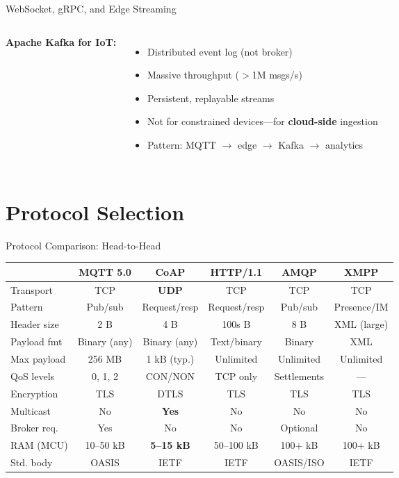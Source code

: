 \documentclass[aspectratio=169,11pt]{beamer}
\begin{document}
\begin{frame}{WebSocket, gRPC, and Edge Streaming}
\begin{columns}
        \vspace{0.2cm}
        \textbf{Apache Kafka for IoT:}
        \begin{itemize}
            \item Distributed event log (not broker)
            \item Massive throughput ($>$1M msgs/s)
            \item Persistent, replayable streams
            \item Not for constrained devices---for \textbf{cloud-side} ingestion
            \item Pattern: MQTT $\rightarrow$ edge $\rightarrow$ Kafka $\rightarrow$ analytics
        \end{itemize}
    \end{columns}
\end{frame}

\section{Protocol Selection}

\begin{frame}{Protocol Comparison: Head-to-Head}
    \footnotesize
    \begin{center}
    \begin{tabular}{lccccc}
        \toprule
        & \textbf{MQTT 5.0} & \textbf{CoAP} & \textbf{HTTP/1.1} & \textbf{AMQP} & \textbf{XMPP} \\
        \midrule
        Transport & TCP & \textbf{UDP} & TCP & TCP & TCP \\
        Pattern & Pub/sub & Request/resp & Request/resp & Pub/sub & Presence/IM \\
        Header size & 2 B & 4 B & 100s B & 8 B & XML (large) \\
        Payload fmt & Binary (any) & Binary (any) & Text/binary & Binary & XML \\
        Max payload & 256 MB & 1 kB (typ.) & Unlimited & Unlimited & Unlimited \\
        QoS levels & 0, 1, 2 & CON/NON & TCP only & Settlements & --- \\
        Encryption & TLS & DTLS & TLS & TLS & TLS \\
        Multicast & No & \textbf{Yes} & No & No & No \\
        Broker req. & Yes & No & No & Optional & No \\
        RAM (MCU) & 10--50 kB & \textbf{5--15 kB} & 50--100 kB & 100+ kB & 100+ kB \\
        Std. body & OASIS & IETF & IETF & OASIS/ISO & IETF \\
        \bottomrule
    \end{tabular}
    \end{center}
    \normalsize
\end{frame}
\end{document}

